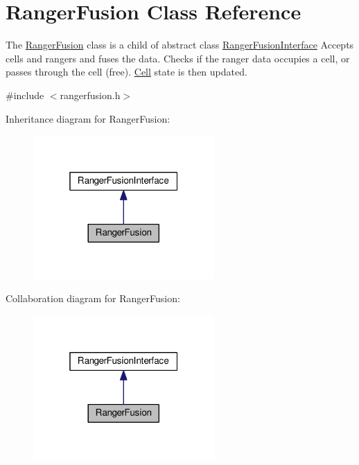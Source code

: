 \hypertarget{classRangerFusion}{}\section{Ranger\+Fusion Class Reference}
\label{classRangerFusion}


The \hyperlink{classRangerFusion}{Ranger\+Fusion} class is a child of abstract class \hyperlink{classRangerFusionInterface}{Ranger\+Fusion\+Interface} Accepts cells and rangers and fuses the data. Checks if the ranger data occupies a cell, or passes through the cell (free). \hyperlink{classCell}{Cell} state is then updated.  




{\ttfamily \#include $<$rangerfusion.\+h$>$}



Inheritance diagram for Ranger\+Fusion\+:\nopagebreak
\begin{figure}[H]
\begin{center}
\leavevmode
\includegraphics[width=196pt]{classRangerFusion__inherit__graph}
\end{center}
\end{figure}


Collaboration diagram for Ranger\+Fusion\+:\nopagebreak
\begin{figure}[H]
\begin{center}
\leavevmode
\includegraphics[width=196pt]{classRangerFusion__coll__graph}
\end{center}
\end{figure}
